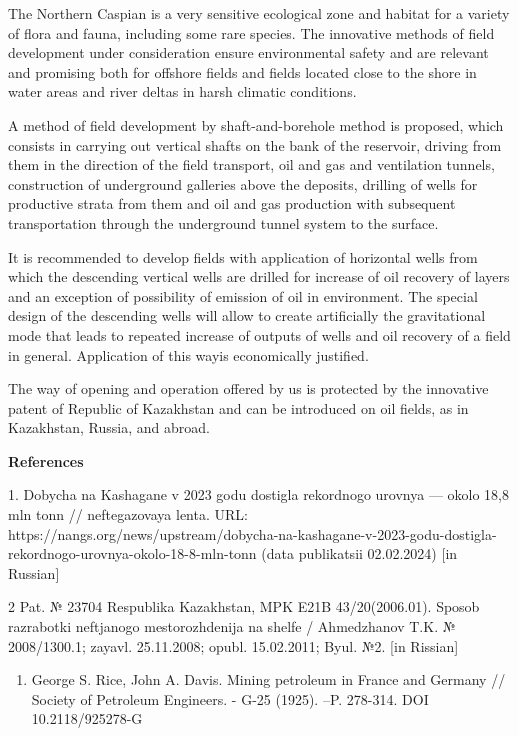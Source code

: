 The Northern Caspian is a very sensitive ecological zone and habitat for
a variety of flora and fauna, including some rare species. The
innovative methods of field development under consideration ensure
environmental safety and are relevant and promising both for offshore
fields and fields located close to the shore in water areas and river
deltas in harsh climatic conditions.

A method of field development by shaft-and-borehole method is proposed,
which consists in carrying out vertical shafts on the bank of the
reservoir, driving from them in the direction of the field transport,
oil and gas and ventilation tunnels, construction of underground
galleries above the deposits, drilling of wells for productive strata
from them and oil and gas production with subsequent transportation
through the underground tunnel system to the surface.

It is recommended to develop fields with application of horizontal wells
from which the descending vertical wells are drilled for increase of oil
recovery of layers and an exception of possibility of emission of oil in
environment. The special design of the descending wells will allow to
create artificially the gravitational mode that leads to repeated
increase of outputs of wells and oil recovery of a field in general.
Application of this wayis economically justified.

The way of opening and operation offered by us is protected by the
innovative patent of Republic of Kazakhstan and can be introduced on oil
fields, as in Kazakhstan, Russia, and abroad.

{\bfseries References}

1. Dobycha na Kashagane v 2023 godu dostigla rekordnogo urovnya ---
okolo 18,8 mln tonn // neftegazovaya lenta. URL:
https://nangs.org/news/upstream/dobycha-na-kashagane-v-2023-godu-dostigla-rekordnogo-urovnya-okolo-18-8-mln-tonn
(data publikatsii 02.02.2024) {[}in Russian{]}

2 Pat. № 23704 Respublika Kazakhstan, MPK E21B 43/20(2006.01). Sposob
razrabotki neftjanogo mestorozhdenija na shel\textquotesingle fe /
Ahmedzhanov T.K. № 2008/1300.1; zayavl. 25.11.2008; opubl. 15.02.2011;
Byul. №2. {[}in Rissian{]}

\begin{enumerate}
\def\labelenumi{\arabic{enumi}.}
\setcounter{enumi}{2}
\item
  George S. Rice, John A. Davis. Mining petroleum in France and Germany
  // Society of Petroleum Engineers. - G-25 (1925). --P. 278-314. DOI
  10.2118/925278-G
\end{enumerate}

